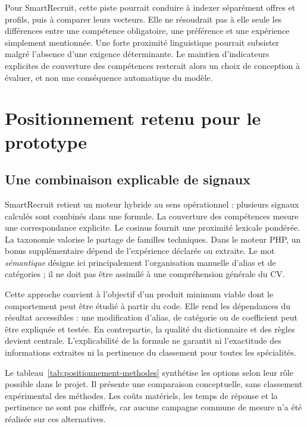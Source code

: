 Pour SmartRecruit, cette piste pourrait conduire à indexer séparément offres et profils, puis à comparer leurs vecteurs. Elle ne résoudrait pas à elle seule les différences entre une compétence obligatoire, une préférence et une expérience simplement mentionnée. Une forte proximité linguistique pourrait subsister malgré l'absence d'une exigence déterminante. Le maintien d'indicateurs explicites de couverture des compétences resterait alors un choix de conception à évaluer, et non une conséquence automatique du modèle.

\section{Positionnement retenu pour le prototype}

\subsection{Une combinaison explicable de signaux}

SmartRecruit retient un moteur hybride au sens opérationnel : plusieurs signaux calculés sont combinés dans une formule. La couverture des compétences mesure une correspondance explicite. Le cosinus fournit une proximité lexicale pondérée. La taxonomie valorise le partage de familles techniques. Dans le moteur PHP, un bonus supplémentaire dépend de l'expérience déclarée ou extraite. Le mot \emph{sémantique} désigne ici principalement l'organisation manuelle d'alias et de catégories ; il ne doit pas être assimilé à une compréhension générale du CV.

Cette approche convient à l'objectif d'un produit minimum viable dont le comportement peut être étudié à partir du code. Elle rend les dépendances du résultat accessibles : une modification d'alias, de catégorie ou de coefficient peut être expliquée et testée. En contrepartie, la qualité du dictionnaire et des règles devient centrale. L'explicabilité de la formule ne garantit ni l'exactitude des informations extraites ni la pertinence du classement pour toutes les spécialités.

Le tableau~\ref{tab:positionnement-methodes} synthétise les options selon leur rôle possible dans le projet. Il présente une comparaison conceptuelle, sans classement expérimental des méthodes. Les coûts matériels, les temps de réponse et la pertinence ne sont pas chiffrés, car aucune campagne commune de mesure n'a été réalisée sur ces alternatives.

